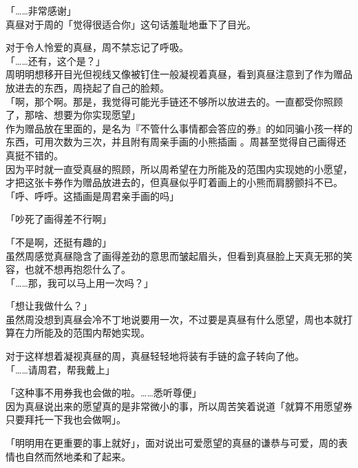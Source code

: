 「……非常感谢」\\

真昼对于周的「觉得很适合你」这句话羞耻地垂下了目光。

对于令人怜爱的真昼，周不禁忘记了呼吸。\\

「……还有，这个是？」\\

周明明想移开目光但视线又像被钉住一般凝视着真昼，看到真昼注意到了作为赠品放进去的东西，周挠起了自己的脸颊。\\

「啊，那个啊。那是，我觉得可能光手链还不够所以放进去的。一直都受你照顾了，那啥、想要为你实现愿望」\\

作为赠品放在里面的，是名为『不管什么事情都会答应的券』的如同骗小孩一样的东西，可用次数为三次，并且附有周亲手画的小熊插画 。周甚至觉得自己画得还真挺不错的。\\

因为平时就一直受真昼的照顾，所以周希望在力所能及的范围内实现她的小愿望，才把这张卡券作为赠品放进去的，但真昼似乎盯着画上的小熊而肩膀颤抖不已。\\

「呼、呼呼。这插画是周君亲手画的吗」

「吵死了画得差不行啊」

「不是啊，还挺有趣的」\\

虽然周感觉真昼隐含了画得差劲的意思而皱起眉头，但看到真昼脸上天真无邪的笑容，也就不想再抱怨什么了。\\

「……那，我可以马上用一次吗？」

「想让我做什么？」\\

虽然周没想到真昼会冷不丁地说要用一次，不过要是真昼有什么愿望，周也本就打算在力所能及的范围内帮她实现。

对于这样想着凝视真昼的周，真昼轻轻地将装有手链的盒子转向了他。\\

「……请周君，帮我戴上」

「这种事不用券我也会做的啦。……悉听尊便」\\

因为真昼说出来的愿望真的是非常微小的事，所以周苦笑着说道「就算不用愿望券只要拜托一下我也会做啊」。

「明明用在更重要的事上就好」，面对说出可爱愿望的真昼的谦恭与可爱，周的表情也自然而然地柔和了起来。\\

